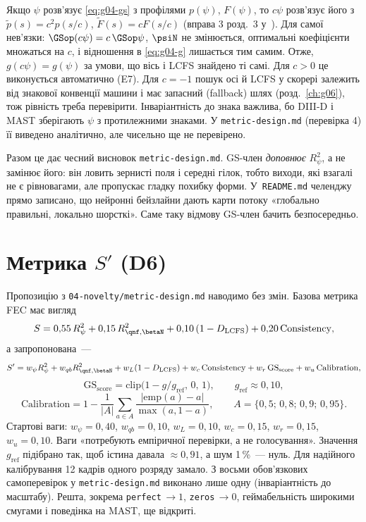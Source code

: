 \begin{derivation}
Якщо $\psi$ розв'язує \eqref{eq:g04-gs} з профілями $p(\psi)$, $F(\psi)$, то $c\psi$ розв'язує його з $\tilde p(s)=c^2p(s/c)$, $\tilde F(s)=cF(s/c)$ (вправа 3 розд.~3 у~\cite{Manual}). Для самої нев'язки: $\GSop(c\psi)=c\,\GSop\psi$, $\psiN$ не змінюється, оптимальні коефіцієнти множаться на $c$, і відношення в \eqref{eq:g04-g} лишається тим самим. Отже, $g(c\psi)=g(\psi)$ за умови, що вісь і LCFS знайдено ті самі. Для $c>0$ це виконується автоматично (E7). Для $c=-1$ пошук осі й LCFS у скорері залежить від знакової конвенції машини і має запасний (fallback) шлях (розд.~\ref{ch:g06}), тож рівність треба перевірити. Інваріантність до знака важлива, бо DIII-D і MAST зберігають $\psi$ з протилежними знаками. У \texttt{metric-design.md} (перевірка 4) її виведено аналітично, але чисельно ще не перевірено.
\end{derivation}

Разом це дає чесний висновок \texttt{metric-design.md}. GS-член \emph{доповнює} $R^2_\psi$, а не замінює його: він ловить зернисті поля і середні гілок, тобто виходи, які взагалі не є рівновагами, але пропускає гладку похибку форми. У~\texttt{README.md} челенджу прямо записано, що нейронні бейзлайни дають карти потоку «глобально правильні, локально шорсткі». Саме таку відмову GS-член бачить безпосередньо.

\section{Метрика \texorpdfstring{$S'$}{S′} (D6)}\label{sec:g04-metric}

Пропозицію з \texttt{04-novelty/metric-design.md} наводимо без змін. Базова метрика FEC має вигляд
\[
  S=0{,}55\,R^2_\psi+0{,}15\,R^2_{\qnf,\betaN}+0{,}10\,(1-D_{\mathrm{LCFS}})+0{,}20\,\mathrm{Consistency},
\]
а запропонована~---
\begin{equation}\label{eq:g04-Sprime}
  S'=w_\psi R^2_\psi+w_{qb}R^2_{\qnf,\betaN}+w_L(1-D_{\mathrm{LCFS}})+w_c\,\mathrm{Consistency}
     +w_r\,\mathrm{GS}_{\mathrm{score}}+w_u\,\mathrm{Calibration},
\end{equation}
\begin{equation}\label{eq:g04-GSscore}
  \mathrm{GS}_{\mathrm{score}}=\mathrm{clip}\big(1-g/g_{\mathrm{ref}},\,0,\,1\big),\qquad g_{\mathrm{ref}}\approx0{,}10,
\end{equation}
\begin{equation}\label{eq:g04-calib}
  \mathrm{Calibration}=1-\frac{1}{|A|}\sum_{a\in A}\frac{|\mathrm{emp}(a)-a|}{\max(a,1-a)},\qquad A=\{0{,}5;\,0{,}8;\,0{,}9;\,0{,}95\}.
\end{equation}
Стартові ваги: $w_\psi=0{,}40$, $w_{qb}=0{,}10$, $w_L=0{,}10$, $w_c=0{,}15$, $w_r=0{,}15$, $w_u=0{,}10$. Ваги «потребують емпіричної перевірки, а не голосування». Значення $g_{\mathrm{ref}}$ підібрано так, щоб істина давала $\approx0{,}91$, а шум 1\,\%~--- нуль. Для надійного калібрування 12 кадрів одного розряду замало. З восьми обов'язкових самоперевірок у \texttt{metric-design.md} виконано лише одну (інваріантність до масштабу). Решта, зокрема \texttt{perfect}$\,\to1$, \texttt{zeros}$\,\to0$, геймабельність широкими смугами і поведінка на MAST, ще відкриті.

